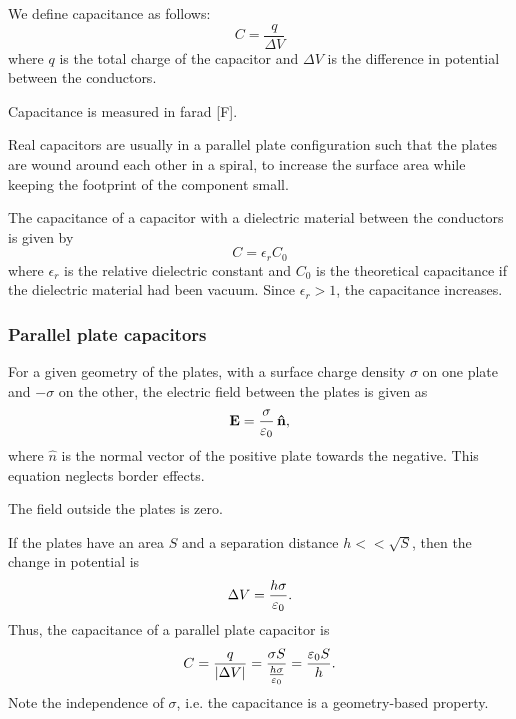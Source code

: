         We define capacitance as follows:
        \begin{equation}
            C = \frac{q}{\Delta V}
        \end{equation}
        where $q$ is the total charge of the capacitor and $\Delta V$ is the difference in potential between the conductors.
        
        Capacitance is measured in farad [F].
        
        Real capacitors are usually in a parallel plate configuration such that the plates are wound around each other in a spiral, 
        to increase the surface area while keeping the footprint of the component small.
        
        The capacitance of a capacitor with a dielectric material between the conductors is given by
        \begin{equation}
            C = \epsilon_rC_0
        \end{equation}
        where $\epsilon_r$ is the relative dielectric constant and $C_0$ is the theoretical capacitance 
        if the dielectric material had been vacuum. Since $\epsilon_r > 1$, the capacitance increases.
    
    \subsubsection{Parallel plate capacitors}
        For a given geometry of the plates, with a surface charge density $\sigma$ on one plate and $-\sigma$ on the other, 
        the electric field between the plates is given as 
        \begin{equation}
            \E = \frac{\sigma}{\e}\,\hat{n},
        \end{equation}
        where $\hat{n}$ is the normal vector of the positive plate towards the negative. This equation neglects border effects.
        
        The field outside the plates is zero.
        
        If the plates have an area $S$ and a separation distance $h << \sqrt{S}$, then the change in potential is
        \begin{equation}
            \Delta V = \frac{h\sigma}{\varepsilon_0}.
        \end{equation}
        Thus, the capacitance of a parallel plate capacitor is
        \begin{equation}
            C = \frac{q}{|\Delta V|} = \frac{\sigma S}{\frac{h\sigma}{\varepsilon_0}} = \frac{\varepsilon_0 S}{h}.
        \end{equation}
        Note the independence of $\sigma$, i.e. the capacitance is a geometry-based property.

